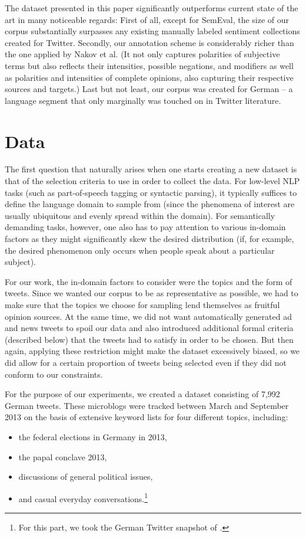 The dataset presented in this paper significantly outperforms current
state of the art in many noticeable regards: First of all, except for
SemEval, the size of our corpus substantially surpasses any existing
manually labeled sentiment collections created for Twitter.  Secondly,
our annotation scheme is considerably richer than the one applied by
Nakov et al. (It not only captures polarities of subjective terms but
also reflects their intensities, possible negations, and modifiers as
well as polarities and intensities of complete opinions, also
capturing their respective sources and targets.) Last but not least,
our corpus was created for German -- a language segment that only
marginally was touched on in Twitter literature.

\section{Data}

The first question that naturally arises when one starts creating a
new dataset is that of the selection criteria to use in order to
collect the data.  For low-level NLP tasks (such as part-of-speech
tagging or syntactic parsing), it typically suffices to define the
language domain to sample from (since the phenomena of interest are
usually ubiquitous and evenly spread within the domain).  For
semantically demanding tasks, however, one also has to pay attention
to various in-domain factors as they might significantly skew the
desired distribution (if, for example, the desired phenomenon only
occurs when people speak about a particular subject).

For our work, the in-domain factors to consider were the topics and
the form of tweets.  Since we wanted our corpus to be as
representative as possible, we had to make sure that the topics we
choose for sampling lend themselves as fruitful opinion sources.  At
the same time, we did not want automatically generated ad and news
tweets to spoil our data and also introduced additional formal
criteria (described below) that the tweets had to satisfy in order to
be chosen.  But then again, applying these restriction might make the
dataset excessively biased, so we did allow for a certain proportion
of tweets being selected even if they did not conform to our
constraints.

For the purpose of our experiments, we created a dataset consisting of
7,992 German tweets.  These microblogs were tracked between March and
September 2013 on the basis of extensive keyword lists for four
different topics, including:
\begin{itemize}
\item the federal elections in Germany in 2013,
\item the papal conclave 2013,
\item discussions of general political issues,
\item and casual everyday conversations.\footnote{For this part, we took
  the German Twitter snapshot of \citet{Scheffler:14}.}
\end{itemize}

